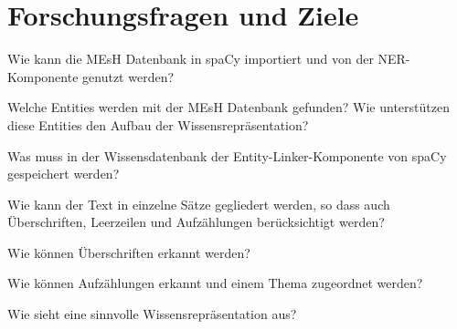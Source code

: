 \chapter{Forschungsfragen und Ziele}

\begin{question}
Wie kann die MEsH Datenbank in spaCy importiert und von der NER-Komponente genutzt werden?
\end{question}

\begin{question}
Welche Entities werden mit der MEsH Datenbank gefunden? Wie unterstützen diese Entities den Aufbau der Wissensrepräsentation?
\end{question}

\begin{question}
Was muss in der Wissensdatenbank der Entity-Linker-Komponente von spaCy gespeichert werden?
\end{question}

\begin{question}
Wie kann der Text in einzelne Sätze gegliedert werden, so dass auch Überschriften, Leerzeilen und Aufzählungen berücksichtigt werden?
\end{question}

\begin{question}
Wie können Überschriften erkannt werden?
\end{question}

\begin{question}
Wie können Aufzählungen erkannt und einem Thema zugeordnet werden?
\end{question}

\begin{question}
Wie sieht eine sinnvolle Wissensrepräsentation aus?
\end{question}
